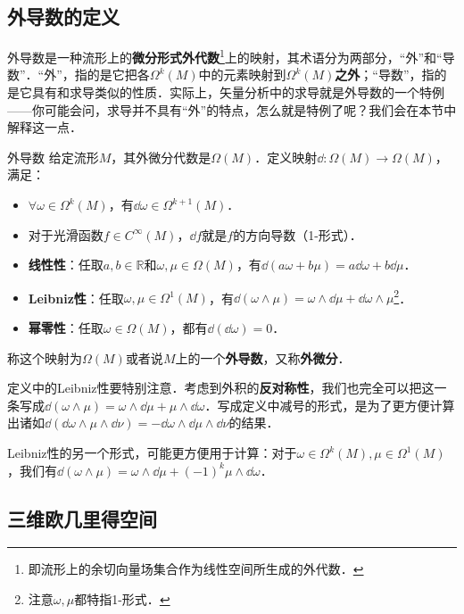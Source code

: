 

\subsection{外导数的定义}

外导数是一种流形上的\textbf{微分形式外代数}\footnote{即流形上的余切向量场集合作为线性空间所生成的外代数．}上的映射，其术语分为两部分，“外”和“导数”．“外”，指的是它把各$\Omega^k(M)$中的元素映射到$\Omega^k(M)$\textbf{之外}；“导数”，指的是它具有和求导类似的性质．实际上，矢量分析中的求导就是外导数的一个特例——你可能会问，求导并不具有“外”的特点，怎么就是特例了呢？我们会在本节中解释这一点．

\begin{definition}{外导数}\label{ExtDer_def1}
给定流形$M$，其外微分代数是$\Omega (M)$．定义映射$\dd:\Omega (M)\rightarrow\Omega (M)$，满足：
\begin{itemize}
\item $\forall \omega\in\Omega^k(M)$，有$\dd \omega\in\Omega^{k+1}(M)$．
\item 对于光滑函数$f\in C^\infty(M)$，$\dd f$就是$f$的方向导数（1-形式）．
\item \textbf{线性性}：任取$a, b\in \mathbb{R}$和$\omega, \mu\in\Omega(M)$，有$\dd(a\omega+b\mu)=a\dd\omega+b\dd\mu$．
\item \textbf{Leibniz性}：任取$\omega, \mu\in\Omega^1(M)$，有$\dd(\omega\wedge\mu)=\omega\wedge\dd\mu+\dd\omega\wedge\mu$\footnote{注意$\omega, \mu$都特指1-形式．}．
\item \textbf{幂零性}：任取$\omega\in\Omega(M)$，都有$\dd(\dd\omega)=0$．
\end{itemize}
称这个映射为$\Omega (M)$或者说$M$上的一个\textbf{外导数}，又称\textbf{外微分}．
\end{definition}

定义中的Leibniz性要特别注意．考虑到外积的\textbf{反对称性}，我们也完全可以把这一条写成$\dd(\omega\wedge\mu)=\omega\wedge\dd\mu+\mu\wedge\dd\omega$．写成定义中减号的形式，是为了更方便计算出诸如$\dd(\dd\omega\wedge\mu\wedge\dd\nu)=-\dd\omega\wedge\dd\mu\wedge\dd\nu$的结果．

Leibniz性的另一个形式，可能更方便用于计算：对于$\omega\in\Omega^k(M), \mu\in\Omega^1(M)$，我们有$\dd(\omega\wedge\mu)=\omega\wedge\dd\mu+(-1)^k\mu\wedge\dd\omega$．

\subsection{三维欧几里得空间}


